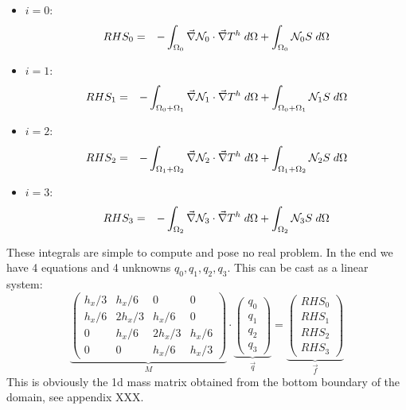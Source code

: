 \begin{itemize}
\item $i=0$:
\begin{eqnarray}
RHS_0 
&=& -\int_{\Omega_0} \vec\nabla {\mathcal{N}}_0 \cdot \vec\nabla T^h \; d\Omega + \int_{\Omega_0} {\mathcal{N}}_0 S \; d\Omega
\end{eqnarray}

\item $i=1$:
\begin{eqnarray}
RHS_1
&=& -\int_{\Omega_0+\Omega_1} \vec\nabla {\mathcal{N}}_1 \cdot \vec\nabla T^h \; d\Omega + \int_{\Omega_0+\Omega_1} {\mathcal{N}}_1 S \; d\Omega
\end{eqnarray}

\item $i=2$:
\begin{eqnarray}
RHS_2
&=& -\int_{\Omega_1+\Omega_2} \vec\nabla {\mathcal{N}}_2 \cdot \vec\nabla T^h \; d\Omega + \int_{\Omega_1+\Omega_2} {\mathcal{N}}_2 S \; d\Omega
\end{eqnarray}

\item $i=3$:
\begin{eqnarray}
RHS_3
&=& -\int_{\Omega_2} \vec\nabla {\mathcal{N}}_3 \cdot \vec\nabla T^h \; d\Omega + \int_{\Omega_2} {\mathcal{N}}_3 S \; d\Omega
\end{eqnarray}

\end{itemize}




These integrals are simple to compute and pose no real problem. 
In the end we have 4 equations and 4 unknowns $q_0,q_1,q_2,q_3$.
This can be cast as a linear system:
\begin{equation}
\underbrace{
\left(
\begin{array}{cccc}
h_x/3 & h_x/6  &  0 & 0\\
h_x/6 & 2h_x/3  & h_x/6  & 0\\
0 & h_x/6  & 2h_x/3  & h_x/6 \\ 
0 & 0  &  h_x/6 & h_x/3
\end{array}
\right)
}_{M}
\cdot
\underbrace{
\left(
\begin{array}{c}
q_0 \\ q_1 \\ q_2 \\ q_3
\end{array}
\right)
}_{\vec{q}}
=
\underbrace{
\left(
\begin{array}{c}
RHS_0 \\ RHS_1 \\ RHS_2 \\ RHS_3
\end{array}
\right)
}_{\vec{f}}
\label{eq:mizu2}
\end{equation}
This is obviously the 1d mass matrix obtained from the bottom boundary of the domain,
see appendix XXX.



